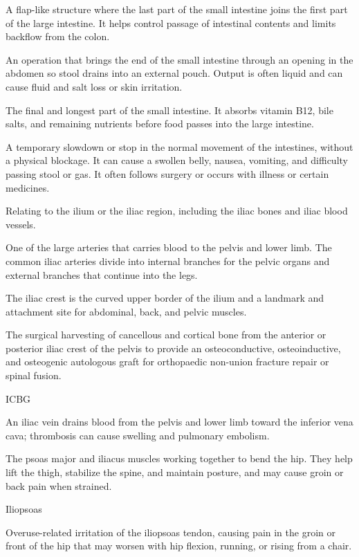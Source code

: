  A flap-like structure where the last part of the small intestine joins the first part of the large intestine. It helps control passage of intestinal contents and limits backflow from the colon.

 An operation that brings the end of the small intestine through an opening in the abdomen so stool drains into an external pouch. Output is often liquid and can cause fluid and salt loss or skin irritation.

 The final and longest part of the small intestine. It absorbs vitamin B12, bile salts, and remaining nutrients before food passes into the large intestine.

 A temporary slowdown or stop in the normal movement of the intestines, without a physical blockage. It can cause a swollen belly, nausea, vomiting, and difficulty passing stool or gas. It often follows surgery or occurs with illness or certain medicines.

 Relating to the ilium or the iliac region, including the iliac bones and iliac blood vessels.

 One of the large arteries that carries blood to the pelvis and lower limb. The common iliac arteries divide into internal branches for the pelvic organs and external branches that continue into the legs.

 The iliac crest is the curved upper border of the ilium and a landmark and attachment site for abdominal, back, and pelvic muscles.

 The surgical harvesting of cancellous and cortical bone from the anterior or posterior iliac crest of the pelvis to provide an osteoconductive, osteoinductive, and osteogenic autologous graft for orthopaedic non-union fracture repair or spinal fusion.

\synonyms
ICBG

 An iliac vein drains blood from the pelvis and lower limb toward the inferior vena cava; thrombosis can cause swelling and pulmonary embolism.

 The psoas major and iliacus muscles working together to bend the hip. They help lift the thigh, stabilize the spine, and maintain posture, and may cause groin or back pain when strained.

\synonyms
Iliopsoas

 Overuse-related irritation of the iliopsoas tendon, causing pain in the groin or front of the hip that may worsen with hip flexion, running, or rising from a chair.

